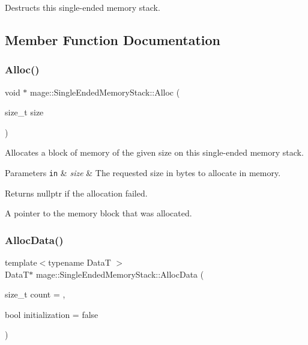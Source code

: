 Destructs this single-\/ended memory stack. 

\subsection{Member Function Documentation}
\hypertarget{classmage_1_1_single_ended_memory_stack_acda0b7f2e61bf8ba8bbb9ba633237866}{}\label{classmage_1_1_single_ended_memory_stack_acda0b7f2e61bf8ba8bbb9ba633237866} 
\subsubsection{\texorpdfstring{Alloc()}{Alloc()}}
{\footnotesize\ttfamily void $\ast$ mage\+::\+Single\+Ended\+Memory\+Stack\+::\+Alloc (\begin{DoxyParamCaption}\item[{size\+\_\+t}]{size }\end{DoxyParamCaption})\hspace{0.3cm}{\ttfamily [noexcept]}}

Allocates a block of memory of the given size on this single-\/ended memory stack.


\begin{DoxyParams}[1]{Parameters}
\mbox{\tt in}  & {\em size} & The requested size in bytes to allocate in memory. \\
\hline
\end{DoxyParams}
\begin{DoxyReturn}{Returns}
{\ttfamily nullptr} if the allocation failed. 

A pointer to the memory block that was allocated. 
\end{DoxyReturn}
\hypertarget{classmage_1_1_single_ended_memory_stack_ae957490450194631b81b9f6ba84f5f5a}{}\label{classmage_1_1_single_ended_memory_stack_ae957490450194631b81b9f6ba84f5f5a} 
\subsubsection{\texorpdfstring{Alloc\+Data()}{AllocData()}}
{\footnotesize\ttfamily template$<$typename DataT $>$ \\
DataT$\ast$ mage\+::\+Single\+Ended\+Memory\+Stack\+::\+Alloc\+Data (\begin{DoxyParamCaption}\item[{size\+\_\+t}]{count = {},  }\item[{bool}]{initialization = {\ttfamily false} }\end{DoxyParamCaption})\hspace{0.3cm}{\ttfamily [noexcept]}}


